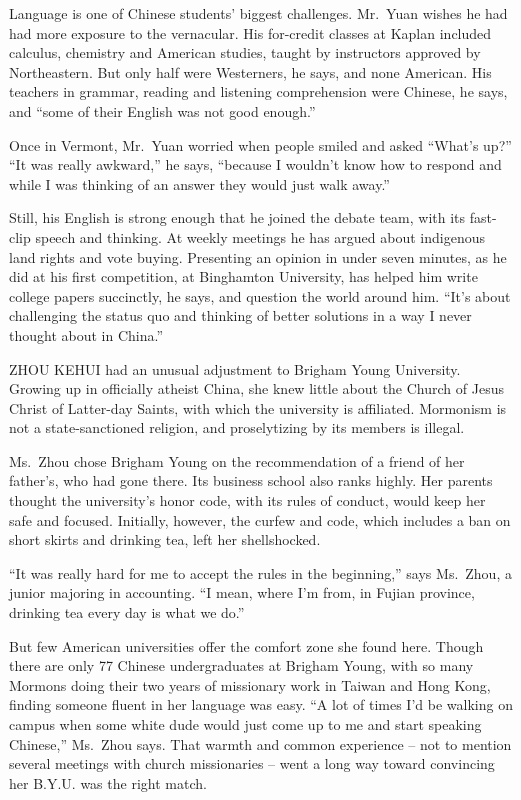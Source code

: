 ﻿\documentclass[12pt]{article}
\begin{document}
Language is one of Chinese students' biggest challenges. Mr.~Yuan wishes he had had more exposure to
the vernacular. His for-credit classes at Kaplan included calculus, chemistry and American studies,
taught by instructors approved by Northeastern. But only half were Westerners, he says, and none
American. His teachers in grammar, reading and listening comprehension were Chinese, he says, and
``some of their English was not good enough.''

Once in Vermont, Mr.~Yuan worried when people smiled and asked ``What's up?'' ``It was really
awkward,'' he says, ``because I wouldn't know how to respond and while I was thinking of an answer
they would just walk away.''

Still, his English is strong enough that he joined the debate team, with its fast-clip speech and
thinking. At weekly meetings he has argued about indigenous land rights and vote buying. Presenting
an opinion in under seven minutes, as he did at his first competition, at Binghamton University, has
helped him write college papers succinctly, he says, and question the world around him. ``It's about
challenging the status quo and thinking of better solutions in a way I never thought about in
China.''

ZHOU KEHUI had an unusual adjustment to Brigham Young University. Growing up in officially atheist
China, she knew little about the Church of Jesus Christ of Latter-day Saints, with which the
university is affiliated. Mormonism is not a state-sanctioned religion, and proselytizing by its
members is illegal.

Ms.~Zhou chose Brigham Young on the recommendation of a friend of her father's, who had gone there.
Its business school also ranks highly. Her parents thought the university's honor code, with its
rules of conduct, would keep her safe and focused. Initially, however, the curfew and code, which
includes a ban on short skirts and drinking tea, left her shellshocked.

``It was really hard for me to accept the rules in the beginning,'' says Ms.~Zhou, a junior majoring
in accounting. ``I mean, where I'm from, in Fujian province, drinking tea every day is what we do.''

But few American universities offer the comfort zone she found here. Though there are only 77
Chinese undergraduates at Brigham Young, with so many Mormons doing their two years of missionary
work in Taiwan and Hong Kong, finding someone fluent in her language was easy. ``A lot of times I'd
be walking on campus when some white dude would just come up to me and start speaking Chinese,''
Ms.~Zhou says. That warmth and common experience ­-- not to mention several meetings with church
missionaries -- went a long way toward convincing her B.Y.U. was the right match.
\end{document}
